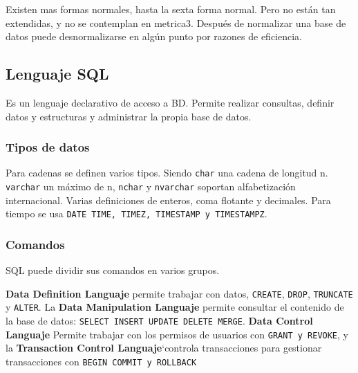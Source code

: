         Existen mas formas normales, hasta la sexta forma normal. Pero no están tan extendidas, y no se contemplan en metrica3. Después de normalizar una base de datos puede desnormalizarse en algún punto por razones de eficiencia.

\subsection{Lenguaje SQL}
    Es un lenguaje declarativo de acceso a BD. Permite realizar consultas, definir datos y estructuras y administrar la propia base de datos.
    \subsubsection{Tipos de datos}
        Para cadenas se definen varios tipos. Siendo \texttt{char} una cadena de longitud n. \texttt{varchar} un máximo de n, \texttt{nchar} y \texttt{nvarchar} soportan alfabetización internacional. Varias definiciones de enteros, coma flotante y decimales. Para tiempo se usa \texttt{DATE TIME, TIMEZ, TIMESTAMP y TIMESTAMPZ}.

    \subsubsection{Comandos}
        SQL puede dividir sus comandos en varios grupos.

        \textbf{Data Definition Languaje} permite trabajar con datos, \texttt{CREATE}, \texttt{DROP}, \texttt{TRUNCATE} y \texttt{ALTER}. La \textbf{Data Manipulation Languaje} permite consultar el contenido de la base de datos: \texttt{SELECT INSERT UPDATE DELETE MERGE}. \textbf{Data Control Languaje} Permite trabajar con los permisos de usuarios con \texttt{GRANT y REVOKE}, y la \textbf{Transaction Control Languaje}`controla transacciones para gestionar transacciones con \texttt{BEGIN COMMIT y ROLLBACK}

